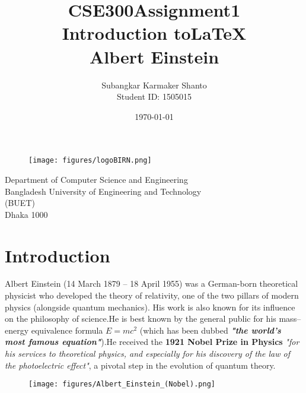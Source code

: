 \documentclass{article}
\title {CSE300\textunderscore Assignment1\\Introduction to\LaTeX\\Albert Einstein}
\author{Subangkar Karmaker Shanto\\Student ID: 1505015}
\date{}
\begin{document}
\maketitle
\thispagestyle{empty}
\null
\vfill
\begin{figure}[h]
    \centering
    \texttt{[image: figures/logoBIRN.png]}
    \label{fig:logo}
\end{figure}
\begin{center}
Department of Computer Science and Engineering \\
Bangladesh University of Engineering and Technology\\
(BUET)\\
Dhaka 1000 \\
\date{\today}
    
\end{center}
\newpage


\section{Introduction}

Albert Einstein (14 March 1879 – 18 April 1955) was a German-born theoretical physicist who developed the theory of relativity, one of the two pillars of modern physics (alongside quantum mechanics). His work is also known for its influence on the philosophy of science.He is best known by the general public for his mass–energy equivalence formula \textbf{$E = mc^2$} (which has been dubbed \textbf{\textit{"the world's most famous equation"}}).He received the \textbf{1921 Nobel Prize in Physics} \textit{"for his services to theoretical physics, and especially for his discovery of the law of the photoelectric effect"}, a pivotal step in the evolution of quantum theory.

\begin{figure}
    \texttt{[image: figures/Albert\_Einstein\_(Nobel).png]}
    \label{fig:einstein_ProPic}
\end{figure}{}
\end{document}
